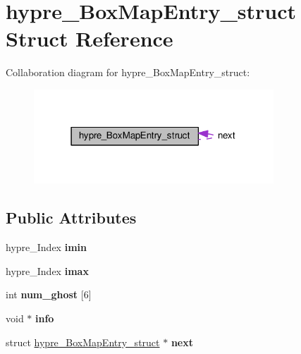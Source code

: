\hypertarget{structhypre__BoxMapEntry__struct}{}\section{hypre\+\_\+\+Box\+Map\+Entry\+\_\+struct Struct Reference}
\label{structhypre__BoxMapEntry__struct}


Collaboration diagram for hypre\+\_\+\+Box\+Map\+Entry\+\_\+struct\+:
\nopagebreak
\begin{figure}[H]
\begin{center}
\leavevmode
\includegraphics[width=255pt]{structhypre__BoxMapEntry__struct__coll__graph}
\end{center}
\end{figure}
\subsection*{Public Attributes}
\begin{DoxyCompactItemize}
\item 
\hypertarget{structhypre__BoxMapEntry__struct_a74be081699cdcc99a89015a3a69d7ec7}{}hypre\+\_\+\+Index {\bfseries imin}\label{structhypre__BoxMapEntry__struct_a74be081699cdcc99a89015a3a69d7ec7}

\item 
\hypertarget{structhypre__BoxMapEntry__struct_a9551acc76f6a9746d51a3a82d2c88c4f}{}hypre\+\_\+\+Index {\bfseries imax}\label{structhypre__BoxMapEntry__struct_a9551acc76f6a9746d51a3a82d2c88c4f}

\item 
\hypertarget{structhypre__BoxMapEntry__struct_aea46c52e26bebb0e977ea048634a3055}{}int {\bfseries num\+\_\+ghost} \mbox{[}6\mbox{]}\label{structhypre__BoxMapEntry__struct_aea46c52e26bebb0e977ea048634a3055}

\item 
\hypertarget{structhypre__BoxMapEntry__struct_a9cac4c3ad6a61328ddcc3ab50c0deca6}{}void $\ast$ {\bfseries info}\label{structhypre__BoxMapEntry__struct_a9cac4c3ad6a61328ddcc3ab50c0deca6}

\item 
\hypertarget{structhypre__BoxMapEntry__struct_a446ea8b44d44d8399002b53dfa45c2ff}{}struct \hyperlink{structhypre__BoxMapEntry__struct}{hypre\+\_\+\+Box\+Map\+Entry\+\_\+struct} $\ast$ {\bfseries next}\label{structhypre__BoxMapEntry__struct_a446ea8b44d44d8399002b53dfa45c2ff}

\end{DoxyCompactItemize}


